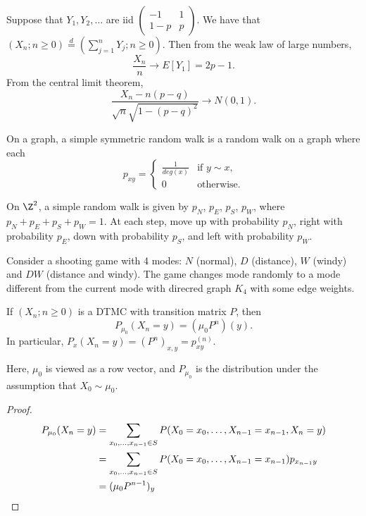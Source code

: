 \begin{examples}
    Suppose that $Y_1, Y_2, \dots$ are iid $\begin{pmatrix}
        -1 & 1 \\
        1-p & p
    \end{pmatrix}$.
    We have that $(X_n; n \ge 0) \stackrel{d}{=} (\sum_{j=1}^{n} Y_j; n \ge 0)$.
    Then from the weak law of large numbers, \[
        \frac{X_n}{n} \to E[Y_1] = 2p - 1.
    \] From the central limit theorem, \[
        \frac{X_n - n(p - q)}{\sqrt{n} \sqrt{1 - (p-q)^2}} \to N(0, 1).
    \]

    On a graph, a simple symmetric random walk is a random walk on a graph
    where each \[
        p_{xy} = \begin{cases}
            \frac1{deg(x)} & \text{if } y \sim x, \\
            0 & \text{otherwise}.
        \end{cases}
    \]

    On $\Z^2$, a simple random walk is given by $p_N$, $p_E$, $p_S$, $p_W$,
    where $p_N + p_E + p_S + p_W = 1$.
    At each step, move up with probability $p_N$, right with probability $p_E$,
    down with probability $p_S$, and left with probability $p_W$.

    \item Consider a shooting game with 4 modes: $N$ (normal), $D$ (distance),
    $W$ (windy) and $DW$ (distance and windy).
    The game changes mode randomly to a mode different from the current mode
    with direcred graph $K_4$ with some edge weights.
\end{examples}

\begin{theorem}
    If $(X_n; n \ge 0)$ is a DTMC with transition matrix $P$, then \[
        P_{\mu_0}(X_n = y) = (\mu_0 P^n)(y).
    \] In particular, $P_x(X_n = y) = (P^n)_{x,y} = p_{xy}^{(n)}$.
\end{theorem}
Here, $\mu_0$ is viewed as a row vector, and $P_{\mu_0}$ is the distribution
under the assumption that $X_0 \sim \mu_0$.
\begin{proof}
    \begin{align*}
        P_{\mu_0}(X_n = y)
            &= \sum_{x_0, \dots, x_{n-1} \in S}
                P(X_0 = x_0, \dots, X_{n-1} = x_{n-1}, X_n = y) \\
            &= \sum_{x_0, \dots, x_{n-1} \in S}
                P(X_0 = x_0, \dots, X_{n-1} = x_{n-1}) p_{x_{n-1} y} \\
            &= (\mu_0 P^{n-1})_y \qedhere
    \end{align*}
\end{proof}

